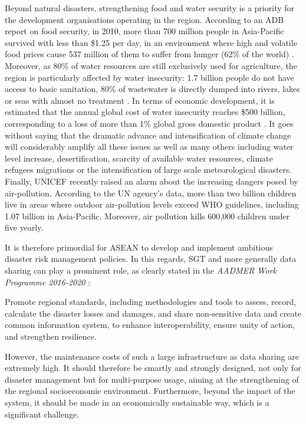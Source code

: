 Beyond natural disasters, strengthening food and water security is a priority for the development organisations operating in the region. According to an ADB report on food security, in 2010, more than 700 million people in Asia-Pacific survived with less than \$1.25 per day, in an environment where high and volatile food prices cause 537 million of them to suffer from hunger (62\% of the world) \cite{ADBfood}. Moreover, as 80\% of water resources are still exclusively used for agriculture, the region is particularly affected by water insecurity: 1.7 billion people do not have access to basic sanitation, 80\% of wastewater is directly dumped into rivers, lakes or seas with almost no treatment \cite{AWDO2016}. In terms of economic development, it is estimated that the annual global cost of water insecurity reaches \$500 billion, corresponding to a loss of more than 1\% global gross domestic product \cite{sadoff}. It goes without saying that the dramatic advance and intensification of climate change will considerably amplify all these issues as well as many others including water level increase, desertification, scarcity of available water resources, climate refugees migrations or the intensification of large scale meteorological disasters. Finally, UNICEF recently raised an alarm about the increasing dangers posed by air-pollution. According to the UN agency's data, more than two billion children live in areas where outdoor air-pollution levels exceed WHO guidelines, including 1.07 billion in Asia-Pacific. Moreover, air pollution kills 600,000 children under five yearly.

\vspace{0.4 cm}

It is therefore primordial for ASEAN to develop and implement ambitious disaster risk management policies. In this regards, SGT and more generally data sharing can play a prominent role, as clearly stated in the \textit{AADMER Work Programme 2016-2020} \cite{aadmer_wp}:

\begin{displayquote}

Promote regional standards, including methodologies and tools to assess, record, calculate the disaster losses and damages, and share non-sensitive data and create common information system, to enhance interoperability, ensure unity of action, and strengthen resilience.

\end{displayquote}

However, the maintenance costs of such a large infrastructure as data sharing are extremely high. It should therefore be smartly and strongly designed, not only for disaster management but for multi-purpose usage, aiming at the strengthening of the regional  socioeconomic environment. Furthermore, beyond the impact of the system, it should be made in an economically sustainable way, which is a significant challenge.



